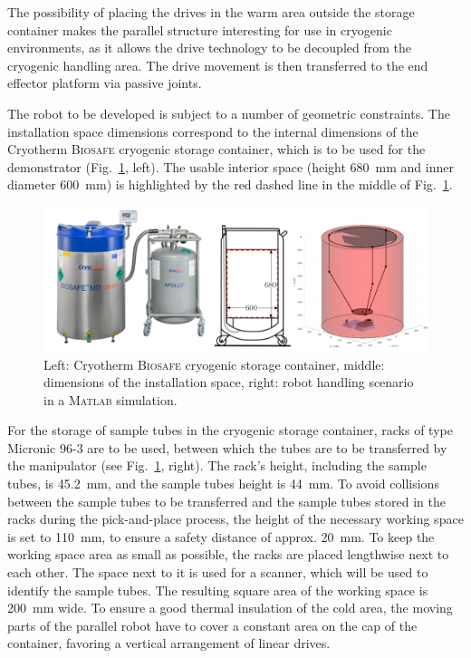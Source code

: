 \documentclass{svproc}
\begin{document}
The possibility of placing the drives in the warm area outside the storage container makes the parallel structure interesting for use in cryogenic environments, as it allows the drive technology to be decoupled from the cryogenic handling area. 
The drive movement is then transferred to the end effector platform via passive joints.

The robot to be developed is subject to a number of geometric constraints.
The installation space dimensions correspond to the internal dimensions of the Cryotherm \textsc{Biosafe} cryogenic storage container, which is to be used for the demonstrator (Fig.~\ref{fig:Tank}, left). 
The usable interior space (height \SI{680}{\milli\metre}  and inner diameter \SI{600}{\milli\metre}) is highlighted by the red dashed line in the middle of Fig.~\ref{fig:Tank}. 

\begin{figure}[b!]
    \centering
    \vspace{-0.5cm} %
	\includegraphics[width=\textwidth,height=\textheight,keepaspectratio]{figures/Tank.png}
	\vspace{-0.7cm} %
	\caption{Left: Cryotherm \textsc{Biosafe} cryogenic storage container, middle: dimensions of the installation space, right: robot handling scenario in a \textsc{Matlab} simulation.}
	\vspace{-0.5cm} %
	\label{fig:Tank}
\end{figure}

For the storage of sample tubes in the cryogenic storage container, racks of type Micronic 96-3 are to be used, between which the tubes are to be transferred by the manipulator (see Fig.~\ref{fig:Tank}, right). 
The rack's height, including the sample tubes, is \SI{45.2}{\milli\metre}, and the sample tubes height is \SI{44}{\milli\metre}. 
To avoid collisions between the sample tubes to be transferred and the sample tubes stored in the racks during the pick-and-place process, the height of the necessary working space is set to \SI{110}{\milli\metre}, to ensure a safety distance of approx. \SI{20}{\milli\metre}. 
To keep the working space area as small as possible, the racks are placed lengthwise next to each other. 
The space next to it is used for a scanner, which will be used to identify the sample tubes. 
The resulting square area of the working space is \SI{200}{\milli\metre} wide.
To ensure a good thermal insulation of the cold area, the moving parts of the parallel robot have to cover a constant area on the cap of the container, favoring a vertical arrangement of linear drives.
\end{document}
